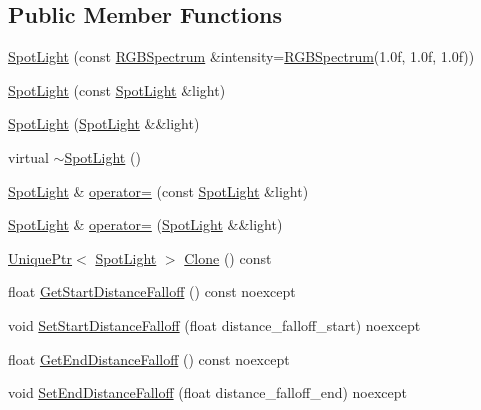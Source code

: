\subsection*{Public Member Functions}
\begin{DoxyCompactItemize}
\item 
\hyperlink{classmage_1_1_spot_light_adc5c7b5fead1b7b0c8728ffd816a9ada}{Spot\+Light} (const \hyperlink{structmage_1_1_r_g_b_spectrum}{R\+G\+B\+Spectrum} \&intensity=\hyperlink{structmage_1_1_r_g_b_spectrum}{R\+G\+B\+Spectrum}(1.\+0f, 1.\+0f, 1.\+0f))
\item 
\hyperlink{classmage_1_1_spot_light_a597abd916ed14372be208a68eb01b871}{Spot\+Light} (const \hyperlink{classmage_1_1_spot_light}{Spot\+Light} \&light)
\item 
\hyperlink{classmage_1_1_spot_light_a3a5574f34f5b80cbeef00709f8a9d094}{Spot\+Light} (\hyperlink{classmage_1_1_spot_light}{Spot\+Light} \&\&light)
\item 
virtual \hyperlink{classmage_1_1_spot_light_aeeaba91c6448102ac6a23587c5366808}{$\sim$\+Spot\+Light} ()
\item 
\hyperlink{classmage_1_1_spot_light}{Spot\+Light} \& \hyperlink{classmage_1_1_spot_light_a04a23d643186a58fb3a03d0a73a63e39}{operator=} (const \hyperlink{classmage_1_1_spot_light}{Spot\+Light} \&light)
\item 
\hyperlink{classmage_1_1_spot_light}{Spot\+Light} \& \hyperlink{classmage_1_1_spot_light_ab79e4bf1c488c1a753f434a4d84567e5}{operator=} (\hyperlink{classmage_1_1_spot_light}{Spot\+Light} \&\&light)
\item 
\hyperlink{namespacemage_a3316d7143a973e37adf1110f2e80ca31}{Unique\+Ptr}$<$ \hyperlink{classmage_1_1_spot_light}{Spot\+Light} $>$ \hyperlink{classmage_1_1_spot_light_a1092a1238be8cfd771a43e6976d16270}{Clone} () const
\item 
float \hyperlink{classmage_1_1_spot_light_a98a5da32f0023d8f0d600fe3f362decd}{Get\+Start\+Distance\+Falloff} () const noexcept
\item 
void \hyperlink{classmage_1_1_spot_light_a68a880f1c8f63e3d6813ca55ac79ffee}{Set\+Start\+Distance\+Falloff} (float distance\+\_\+falloff\+\_\+start) noexcept
\item 
float \hyperlink{classmage_1_1_spot_light_a4d1d2c3a5f5b2a01e6e625d84eb588d1}{Get\+End\+Distance\+Falloff} () const noexcept
\item 
void \hyperlink{classmage_1_1_spot_light_ad0ed513c07128338abd8b23295004456}{Set\+End\+Distance\+Falloff} (float distance\+\_\+falloff\+\_\+end) noexcept

\end{DoxyCompactItemize}
